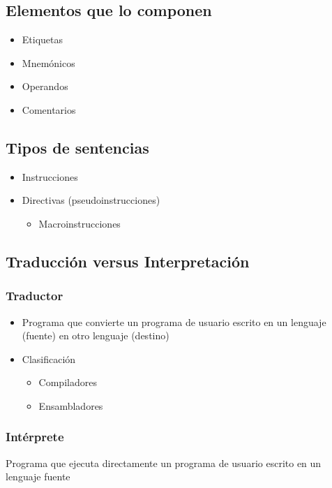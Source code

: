\subsection{Elementos que lo componen}
	\begin{itemize}	
	\item Etiquetas
	\item Mnemónicos
	\item Operandos
	\item Comentarios
	\end{itemize}	

\subsection{Tipos de sentencias}
	\begin{itemize}
	\item Instrucciones
	\item Directivas (pseudoinstrucciones)
		\begin{itemize}
		\item Macroinstrucciones
		\end{itemize}
	\end{itemize}	

\subsection{Traducción versus Interpretación}

	\subsubsection{Traductor}
	\begin{itemize}
	\item Programa que convierte un programa de usuario escrito en un lenguaje (fuente) en otro lenguaje (destino)
	\item Clasificación
		\begin{itemize}
		\item Compiladores
		\item Ensambladores
		\end{itemize}	
	\end{itemize}	

	\subsubsection{Intérprete}	
	Programa que ejecuta directamente un programa de usuario escrito en un lenguaje fuente

